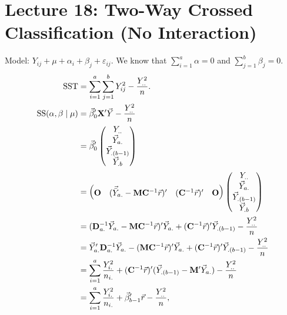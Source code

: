 \section{Lecture 18: Two-Way Crossed Classification (No Interaction)}
Model: $ Y_{ij}+\mu+\alpha_i+\beta_j+\varepsilon_{ij} $. We know that
$ \sum_{i=1}^{a}\alpha=0 $ and $ \sum_{j=1}^{b}\beta_j=0 $.
\begin{align*}
    \text{SST}
     & =\sum_{i=1}^{a}\sum_{j=1}^{b}Y_{ij}^2-\frac{Y_{..}^2}{n}.                                                                                                                     \\
    \text{SS}(\alpha,\beta\mid \mu)
     & =\vec{\beta}_0'\mathbf{X}'\vec{Y}-\frac{Y_{..}^2}{n}                                                                                                                    \\
     & =\vec{\beta}_0'\begin{pmatrix}
                             Y_{..}              \\
                             \vec{Y}_{a.}     \\
                             \vec{Y}_{.(b-1)} \\
                             \vec{Y}_{.b}
                         \end{pmatrix}                                                                                                                                         \\
     & =\begin{pmatrix}
            \mathbf{O}                                                    &
            ( \vec{\bar{Y}}_{a.}-\mathbf{M}\mathbf{C}^{-1}\vec{r})' &
            ( \mathbf{C}^{-1}\vec{r} )'                                &
            \mathbf{O}
        \end{pmatrix}\begin{pmatrix}
                         Y_{..}              \\
                         \vec{Y}_{a.}     \\
                         \vec{Y}_{.(b-1)} \\
                         \vec{Y}_{.b}
                     \end{pmatrix}                                                                                                \\
     & =(\mathbf{D}_{a.}^{-1}\vec{Y}_{a.}-\mathbf{M}\mathbf{C}^{-1}\vec{r})'\vec{Y}_{a.}+(\mathbf{C}^{-1}\vec{r})'\vec{Y}_{.(b-1)}-\frac{Y_{..}^2}{n}                 \\
     & =\vec{Y}_{a.}'\mathbf{D}_{a.}^{-1}\vec{Y}_{a.}-(\mathbf{M}\mathbf{C}^{-1}\vec{r})'\vec{Y}_{a.}+(\mathbf{C}^{-1}\vec{r})'\vec{Y}_{.(b-1)}-\frac{Y_{..}^2}{n} \\
     & =\sum_{i=1}^{a}\frac{Y_{i.}^2}{n_{i.}}+(\mathbf{C}^{-1}\vec{r})'(\vec{Y}_{.(b-1)}-\mathbf{M}'\vec{Y}_{a.})-\frac{Y_{..}^2}{n}                                        \\
     & =\sum_{i=1}^{a}\frac{Y_{i.}^2}{n_{i.}}+\vec{\beta}_{b-1}'\vec{r}-\frac{Y_{..}^2}{n},
\end{align*}
